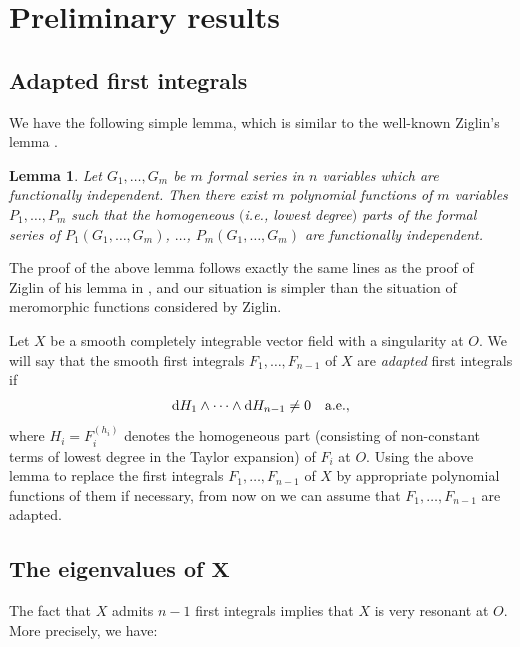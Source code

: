 \documentclass[pdftex]{sigma}
\numberwithin{equation}{section}
\newtheorem{lem}[thm]{Lemma}
\begin{document}
\section{Preliminary results}\label{section2}

\subsection{Adapted f\/irst integrals}\label{subsection:adapted}

We have the following simple lemma, which is similar to
the well-known Ziglin's lemma \cite{Ziglin-Branching1982}.

\begin{lem}
 Let $G_1,\dots,G_m$ be $m$ formal series in $n$ variables which are functionally independent. Then
there exist $m$ polynomial functions of $m$ variables $P_1,\dots, P_m$ such that the homogeneous
$($i.e., lowest degree$)$ parts of the formal series of $P_1(G_1,\dots,G_m)$, $\dots$, $P_m(G_1,\dots,G_m)$ are functionally independent.
\end{lem}

The proof of the above lemma follows exactly the same lines as the proof of Ziglin of his lemma in
\cite{Ziglin-Branching1982}, and our situation is simpler than the situation of meromorphic
functions considered by Ziglin.

Let $X$ be a smooth completely integrable vector f\/ield with a singularity at $O$.
We will say that the smooth f\/irst integrals $F_1, \dots, F_{n-1}$ of $X$
are \emph{adapted} f\/irst integrals if
\begin{gather*}
 {\rm d}H_1 \wedge \dots \wedge {\rm d}H_{n-1} \neq 0 \quad \text{a.e.},
\end{gather*}
where $H_i = F_i^{(h_i)}$ denotes the homogeneous part (consisting of non-constant terms of lowest degree in the Taylor
expansion) of $F_i$ at $O$.
Using the above lemma to replace the f\/irst integrals $F_1, \dots, F_{n-1}$ of $X$ by appropriate
polynomial functions of them if necessary, from now on we can assume that $F_1,\dots, F_{n-1}$ are adapted.

\subsection[The eigenvalues of $X$]{The eigenvalues of $\boldsymbol{X}$}

The fact that $X$ admits $n-1$ f\/irst integrals implies that $X$ is very resonant at $O$. More precisely, we have:
\end{document}
